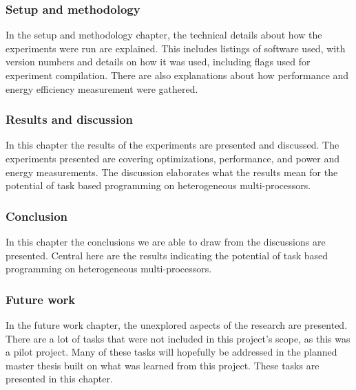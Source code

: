 \subsubsection{Setup and methodology}
In the setup and methodology chapter, the technical details about how the experiments were run are explained.
This includes listings of software used, with version numbers and details on how it was used, including flags used for experiment compilation.
There are also explanations about how performance and energy efficiency measurement were gathered.

\subsubsection{Results and discussion}
In this chapter the results of the experiments are presented and discussed.
The experiments presented are covering optimizations, performance, and power and energy measurements.
The discussion elaborates what the results mean for the potential of task based programming on heterogeneous multi-processors.

\subsubsection{Conclusion}
In this chapter the conclusions we are able to draw from the discussions are presented.
Central here are the results indicating the potential of task based programming on heterogeneous multi-processors.

\subsubsection{Future work}
In the future work chapter, the unexplored aspects of the research are presented.
There are a lot of tasks that were not included in this project's scope, as this was a pilot project.
Many of these tasks will hopefully be addressed in the planned master thesis built on what was learned from this project.
These tasks are presented in this chapter.


